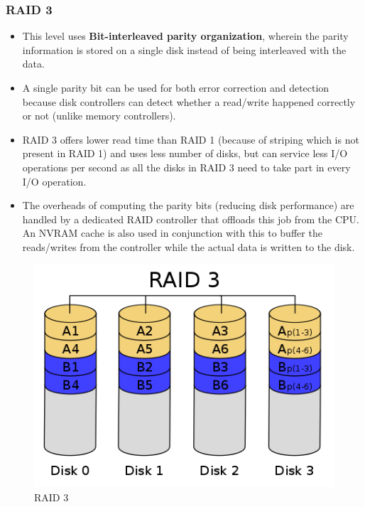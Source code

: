 \documentclass{article}
\theoremstyle{plain}
\theoremstyle{definition}
\begin{document}
\subsubsection{RAID 3}
\begin{itemize}
    \item This level uses \textbf{Bit-interleaved parity organization}, wherein the parity information is stored on a single disk instead of being interleaved with the data. 
    
    \item A single parity bit can be used for both error correction and detection because disk controllers can detect whether a read/write happened correctly or not (unlike memory controllers). 
    
    \item RAID 3 offers lower read time than RAID 1 (because of striping which is not present in RAID 1) and uses less number of disks, but can service less I/O operations per second as all the disks in RAID 3 need to take part in every I/O operation.
    
    \item The overheads of computing the parity bits (reducing disk performance) are handled by a dedicated RAID controller that offloads this job from the CPU. An NVRAM cache is also used in conjunction with this to buffer the reads/writes from the controller while the actual data is written to the disk. 
\end{itemize}

\begin{figure}[!h]
    \centering
    \includegraphics[scale=0.4]{raid3.png}
    \caption{RAID 3}
    \label{fig:my_label_3}
\end{figure}
\end{document}
